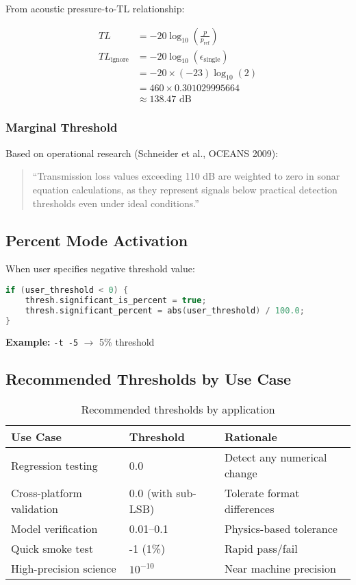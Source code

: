 From acoustic pressure-to-TL relationship:

\begin{align}
    TL &= -20 \log_{10}\left(\frac{p}{p_{\text{ref}}}\right) \\
    TL_{\text{ignore}} &= -20 \log_{10}(\epsilon_{\text{single}}) \\
    &= -20 \times (-23) \log_{10}(2) \\
    &= 460 \times 0.301029995664 \\
    &\approx 138.47 \text{ dB}
\end{align}

\subsubsection{Marginal Threshold}

Based on operational research (Schneider et al., OCEANS 2009):

\begin{quote}
``Transmission loss values exceeding 110 dB are weighted to zero in sonar equation calculations, as they represent signals below practical detection thresholds even under ideal conditions.''
\end{quote}

\subsection{Percent Mode Activation}

When user specifies negative threshold value:

\begin{lstlisting}[language=C++]
if (user_threshold < 0) {
    thresh.significant_is_percent = true;
    thresh.significant_percent = abs(user_threshold) / 100.0;
}
\end{lstlisting}

\textbf{Example:} \texttt{-t -5} $\to$ 5\% threshold

\subsection{Recommended Thresholds by Use Case}

\begin{table}[h]
\centering
\begin{tabular}{@{}lll@{}}
\toprule
\textbf{Use Case} & \textbf{Threshold} & \textbf{Rationale} \\ \midrule
Regression testing & 0.0 & Detect any numerical change \\
Cross-platform validation & 0.0 (with sub-LSB) & Tolerate format differences \\
Model verification & 0.01--0.1 & Physics-based tolerance \\
Quick smoke test & -1 (1\%) & Rapid pass/fail \\
High-precision science & $10^{-10}$ & Near machine precision \\ \bottomrule
\end{tabular}
\caption{Recommended thresholds by application}
\label{tab:recommended}
\end{table}

